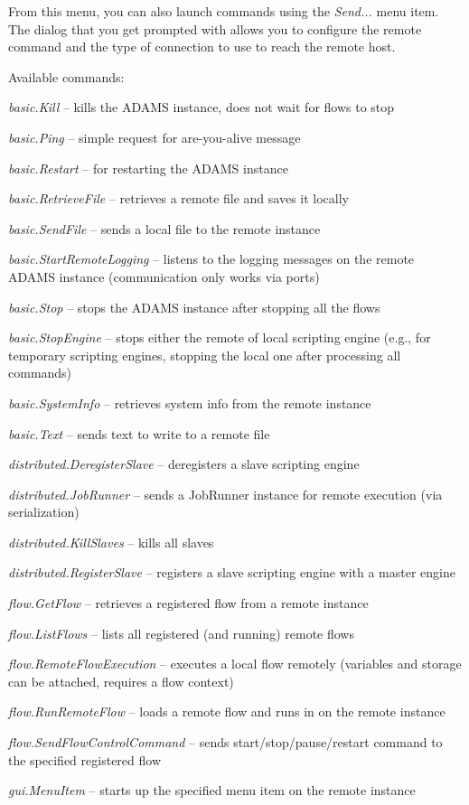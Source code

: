 From this menu, you can also launch commands using the \textit{Send...}
menu item. The dialog that you get prompted with allows you to configure
the remote command and the type of connection to use to reach the remote
host.

Available commands:
\begin{tight_itemize}
  \item \textit{basic.Kill} -- kills the ADAMS instance, does not wait for flows
  to stop
  \item \textit{basic.Ping} -- simple request for are-you-alive message
  \item \textit{basic.Restart} -- for restarting the ADAMS instance
  \item \textit{basic.RetrieveFile} -- retrieves a remote file and saves it locally
  \item \textit{basic.SendFile} -- sends a local file to the remote instance
  \item \textit{basic.StartRemoteLogging} -- listens to the logging messages on the
  remote ADAMS instance (communication only works via ports)
  \item \textit{basic.Stop} -- stops the ADAMS instance after stopping all the flows
  \item \textit{basic.StopEngine} -- stops either the remote of local scripting engine
  (e.g., for temporary scripting engines, stopping the local one after processing
  all commands)
  \item \textit{basic.SystemInfo} -- retrieves system info from the remote instance
  \item \textit{basic.Text} -- sends text to write to a remote file
  \item \textit{distributed.DeregisterSlave} -- deregisters a slave scripting engine
  \item \textit{distributed.JobRunner} -- sends a JobRunner instance for remote
  execution (via serialization)
  \item \textit{distributed.KillSlaves} -- kills all slaves
  \item \textit{distributed.RegisterSlave} -- registers a slave scripting engine
  with a master engine
  \item \textit{flow.GetFlow} -- retrieves a registered flow from a remote instance
  \item \textit{flow.ListFlows} -- lists all registered (and running) remote flows
  \item \textit{flow.RemoteFlowExecution} -- executes a local flow remotely
  (variables and storage can be attached, requires a flow context)
  \item \textit{flow.RunRemoteFlow} -- loads a remote flow and runs in on the
  remote instance
  \item \textit{flow.SendFlowControlCommand} -- sends start/stop/pause/restart
  command to the specified registered flow
  \item \textit{gui.MenuItem} -- starts up the specified menu item on the
  remote instance
\end{tight_itemize}

